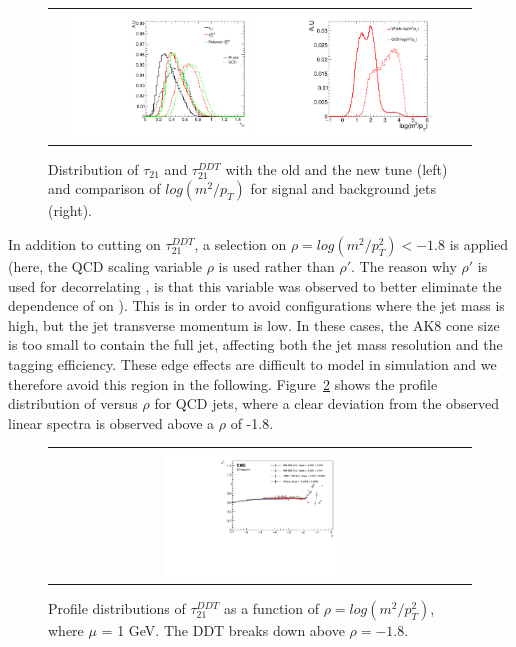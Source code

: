 \begin{figure}[h!]
\centering
\begin{tabular}{cc}
\includegraphics[width=0.45\textwidth]{figures/analysis/search3/AN-17-303/vtag/compare_tau21s.pdf}
\includegraphics[width=0.45\textwidth]{figures/analysis/search3/AN-17-303/vtag/logm2pt.pdf}
\end{tabular}
\caption{Distribution of $\tau_{21}$ and $\tau_{21}^{DDT}$ with the old and the new tune (left) and comparison of $log(m^2/p_T)$ for signal and background jets (right).}
\label{fig:searchIII:m2pt}
\end{figure}\noindent 
In addition to cutting on $\tau_{21}^{DDT}$, a selection on $\rho = log(m^2/p_T^2) < -1.8 $ is applied (here, the QCD scaling variable $\rho$ is used rather than $\rho'$. The reason why $\rho'$ is used for decorrelating \ddt, is that this variable was observed to better eliminate the dependence of \nsubj on \PT). This is in order to avoid configurations where the jet mass is high, but the jet transverse momentum is low. In these cases, the AK8 cone size is too small to contain the full jet, affecting both the jet mass resolution and the \ddt tagging efficiency. These edge effects are difficult to model in simulation and we therefore avoid this region in the following. Figure~\ref{fig:rhoDDT} shows the profile distribution of \ddt versus $\rho$ for QCD jets, where a clear deviation from the observed linear spectra is observed above a $\rho$ of -1.8.
\begin{figure}[h!]
\centering
\begin{tabular}{cc}
\includegraphics[width=0.45\textwidth]{figures/analysis/search3/AN-17-303/vtag/rho_pythia_FullSel_rhoClosure.pdf}
\end{tabular}
\caption{Profile distributions of $\tau_{21}^{DDT}$ as a function of $\rho = log(m^2/p_T^2)$, where $\mu$ = 1 GeV. The DDT breaks down above $\rho=-1.8$. }
\label{fig:rhoDDT}
\end{figure}
